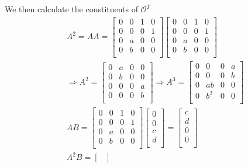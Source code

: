 \documentclass [12pt,letterpaper]{exam}
\begin{document}
We then calculate the constituents of $\mathcal{O}^T$
\begin{align}
& A^2 = AA = \begin{bmatrix}
0 & 0 & 1 & 0 \\
0 & 0 & 0 & 1 \\
0 & a & 0 & 0 \\
0 & b & 0 & 0 \\
\end{bmatrix} \begin{bmatrix}
0 & 0 & 1 & 0 \\
0 & 0 & 0 & 1 \\
0 & a & 0 & 0 \\
0 & b & 0 & 0 \\
\end{bmatrix} \\
& \Rightarrow A^2 = \begin{bmatrix}
0 & a & 0 & 0 \\
0 & b & 0 & 0 \\
0 & 0 & 0 & a \\
0 & 0 & 0 & b \\
\end{bmatrix}
\Rightarrow A^3 = \begin{bmatrix}
0 & 0 & 0 & a \\
0 & 0 & 0 & b \\
0 & ab & 0 & 0 \\
0 & b^2 & 0 & 0 \\
\end{bmatrix} \\
& AB = \begin{bmatrix}
0 & 0 & 1 & 0 \\
0 & 0 & 0 & 1 \\
0 & a & 0 & 0 \\
0 & b & 0 & 0 \\
\end{bmatrix} \begin{bmatrix}
0 \\
0 \\
c \\
d \\
\end{bmatrix} = \begin{bmatrix}
c \\
d \\
0 \\
0 \\
\end{bmatrix} \\
& A^2B = \begin{bmatrix}

\end{bmatrix}
\end{align}
\end{document}
